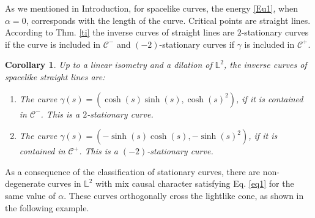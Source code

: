 \documentclass[a4paper,12pt]{amsart}
\newtheorem{corollary}[theorem]{Corollary}
\theoremstyle{definition}
\def\l{\mathbb L}
\begin{document}
As we mentioned in Introduction, for spacelike curves, the energy \eqref{Eu1}, when $\alpha=0$, corresponds with the length of the curve. Critical points are straight lines. According to Thm. \ref{ti} the inverse curves of straight lines are $2$-stationary curves if the curve is included in $\mathcal{C}^-$ and $(-2)$-stationary curves if $\gamma$ is included in $\mathcal{C}^+$.

\begin{corollary} Up to a linear isometry and a dilation of $\l^2$, the inverse curves of spacelike straight lines are:
\begin{enumerate}
\item The curve $\gamma(s)=(\cosh(s)\sinh(s),\cosh(s)^2)$, if it is contained in $\mathcal{C}^-$. This is a $2$-stationary curve.  
\item The curve $\gamma(s)=(-\sinh(s)\cosh(s),-\sinh(s)^2)$, if it is contained in $\mathcal{C}^+$. This is a $(-2)$-stationary curve. 
\end{enumerate}
\end{corollary}

 As a consequence of the  classification of stationary curves, there are non-degenerate curves in $\l^2$ with mix causal character satisfying Eq. \eqref{eq1} for the same value of $\alpha$. These curves orthogonally cross the lightlike cone, as shown in the following example.
 
\end{document}
